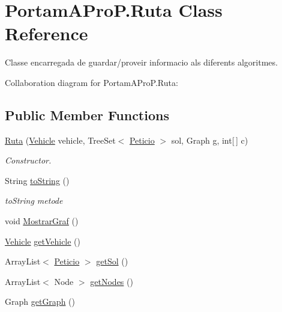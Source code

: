 \hypertarget{class_portam_a_pro_p_1_1_ruta}{}\section{Portam\+A\+Pro\+P.\+Ruta Class Reference}
\label{class_portam_a_pro_p_1_1_ruta}


Classe encarregada de guardar/proveir informacio als diferents algoritmes.  




Collaboration diagram for Portam\+A\+Pro\+P.\+Ruta\+:
\subsection*{Public Member Functions}
\begin{DoxyCompactItemize}
\item 
\hyperlink{class_portam_a_pro_p_1_1_ruta_aab7322baacb2b1bec9825d98c04b98aa}{Ruta} (\hyperlink{class_portam_a_pro_p_1_1_vehicle}{Vehicle} vehicle, Tree\+Set$<$ \hyperlink{class_portam_a_pro_p_1_1_peticio}{Peticio} $>$ sol, Graph g, int\mbox{[}$\,$\mbox{]} c)
\begin{DoxyCompactList}\small\item\em Constructor. \end{DoxyCompactList}\item 
String \hyperlink{class_portam_a_pro_p_1_1_ruta_abf345e4aeeb6bc1f7a8c813ca4d38ff9}{to\+String} ()
\begin{DoxyCompactList}\small\item\em to\+String metode \end{DoxyCompactList}\item 
void \hyperlink{class_portam_a_pro_p_1_1_ruta_ac0b686760e83d18cc6b3158c4fe4506e}{Mostrar\+Graf} ()
\item 
\hyperlink{class_portam_a_pro_p_1_1_vehicle}{Vehicle} \hyperlink{class_portam_a_pro_p_1_1_ruta_a66aba8b89762ddc8df0a3bb3741ece40}{get\+Vehicle} ()
\item 
Array\+List$<$ \hyperlink{class_portam_a_pro_p_1_1_peticio}{Peticio} $>$ \hyperlink{class_portam_a_pro_p_1_1_ruta_a996ba51c71a91919b99c1df56bb6d0ad}{get\+Sol} ()
\item 
Array\+List$<$ Node $>$ \hyperlink{class_portam_a_pro_p_1_1_ruta_ac3c8cf0f68e31d67b32cc9e7e0914f46}{get\+Nodes} ()
\item 
Graph \hyperlink{class_portam_a_pro_p_1_1_ruta_ae131ddbcf7bb38b74606c6d17038127e}{get\+Graph} ()
\item 

\end{DoxyCompactItemize}
